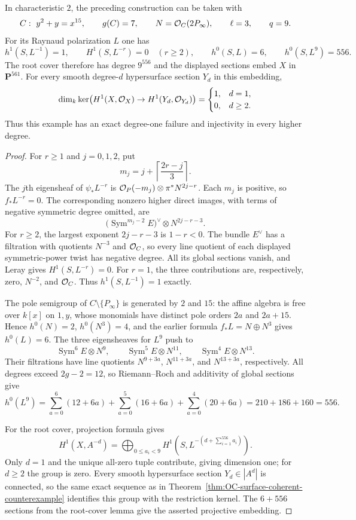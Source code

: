 \begin{corollary}
\label{cor:OC-surface-exact-degrees}
In characteristic $2$, the preceding construction can be taken with
\[
 C:\ y^2+y=x^{15},\qquad g(C)=7,\qquad
 N=\mathcal O_C(2P_\infty),\qquad \ell=3,\qquad q=9.
\]
For its Raynaud polarization $L$ one has
\[
 h^1(S,L^{-1})=1,
 \qquad H^1(S,L^{-r})=0\quad(r\geq2),
 \qquad h^0(S,L)=6,
 \qquad h^0(S,L^9)=556.
\]
The root cover therefore has degree $9^{556}$ and the displayed sections embed $X$ in $\mathbf P^{561}$.  For every smooth degree-$d$ hypersurface section $Y_d$ in this embedding,
\[
 \dim_k\ker\bigl(H^1(X,\mathcal O_X)\to H^1(Y_d,\mathcal O_{Y_d})\bigr)
   =\begin{cases}1,&d=1,\\0,&d\geq2.\end{cases}
\]
Thus this example has an exact degree-one failure and injectivity in every higher degree.
\end{corollary}
\begin{proof}
For $r\geq1$ and $j=0,1,2$, put
\[
                     m_j=j+\left\lceil\frac{2r-j}{3}\right\rceil.
\]
The $j$th eigensheaf of $\psi_*L^{-r}$ is
$\mathcal O_P(-m_j)\otimes\pi^*N^{2j-r}$.  Each $m_j$ is positive, so $f_*L^{-r}=0$.  The corresponding nonzero higher direct images, with terms of negative symmetric degree omitted, are
\[
 \bigl(\operatorname{Sym}^{m_j-2}E\bigr)^\vee\otimes N^{2j-r-3}.
\]
For $r\geq2$, the largest exponent $2j-r-3$ is $1-r<0$.  The bundle $E^\vee$ has a filtration with quotients $N^{-3}$ and $\mathcal O_C$, so every line quotient of each displayed symmetric-power twist has negative degree.  All its global sections vanish, and Leray gives $H^1(S,L^{-r})=0$.
For $r=1$, the three contributions are, respectively, zero, $N^{-2}$, and $\mathcal O_C$.  Thus $h^1(S,L^{-1})=1$ exactly.

The pole semigroup of $C\setminus\{P_\infty\}$ is generated by $2$ and $15$: the affine algebra is free over $k[x]$ on $1,y$, whose monomials have distinct pole orders $2a$ and $2a+15$.  Hence $h^0(N)=2$, $h^0(N^3)=4$, and the earlier formula $f_*L=N\oplus N^3$ gives $h^0(L)=6$.
The three eigensheaves for $L^9$ push to
\[
 \operatorname{Sym}^{6}E\otimes N^9,\qquad
 \operatorname{Sym}^{5}E\otimes N^{11},\qquad
 \operatorname{Sym}^{4}E\otimes N^{13}.
\]
Their filtrations have line quotients $N^{9+3a}$, $N^{11+3a}$, and $N^{13+3a}$, respectively.  All degrees exceed $2g-2=12$, so Riemann--Roch and additivity of global sections give
\[
 h^0(L^9)
 =\sum_{a=0}^{6}(12+6a)
   +\sum_{a=0}^{5}(16+6a)
   +\sum_{a=0}^{4}(20+6a)
 =210+186+160=556.
\]

For the root cover, projection formula gives
\[
 H^1(X,A^{-d})
  =\bigoplus_{0\leq a_i<9}
          H^1\left(S,L^{-(d+\sum_{i=1}^{556}a_i)}\right).
\]
Only $d=1$ and the unique all-zero tuple contribute, giving dimension one; for $d\geq2$ the group is zero.  Every smooth hypersurface section $Y_d\in|A^d|$ is connected, so the same exact sequence as in Theorem~\ref{thm:OC-surface-coherent-counterexample} identifies this group with the restriction kernel.  The $6+556$ sections from the root-cover lemma give the asserted projective embedding.
\end{proof}

